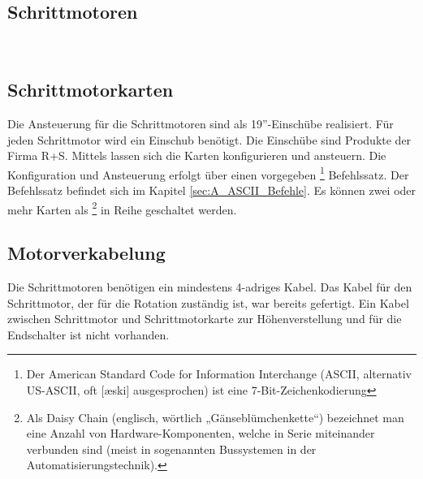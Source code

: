 \subsection{Schrittmotoren}
\label{sec:Schrittmotoren}
\\

\subsection{Schrittmotorkarten}
\label{sec:Schrittmotorkarten}
Die Ansteuerung für die Schrittmotoren sind als 19''-Einschübe realisiert. Für jeden Schrittmotor wird ein Einschub benötigt.
Die Einschübe sind Produkte der Firma R+S. Mittels  lassen sich die Karten konfigurieren und ansteuern. Die Konfiguration und Ansteuerung erfolgt über einen vorgegeben 
\footnote{Der American Standard Code for Information Interchange (ASCII, alternativ US-ASCII, oft [æski] ausgesprochen) ist eine 7-Bit-Zeichenkodierung\cite{wiki:ASCII}}
 Befehlssatz. Der Befehlssatz befindet sich im Kapitel \ref{sec:A_ASCII_Befehle}. Es können zwei oder mehr Karten als 
\footnote{Als Daisy Chain (englisch, wörtlich „Gänseblümchenkette“) bezeichnet man eine Anzahl von Hardware-Komponenten, welche in Serie miteinander verbunden sind (meist in sogenannten Bussystemen in der Automatisierungstechnik).\cite{wiki:Daisy} } 
in Reihe geschaltet werden.
\subsection{Motorverkabelung}
\label{sec:Motorverkabelung}
Die Schrittmotoren benötigen ein mindestens 4-adriges Kabel. Das Kabel für den Schrittmotor, der für die Rotation zuständig ist, war bereits gefertigt. Ein Kabel zwischen Schrittmotor und Schrittmotorkarte zur Höhenverstellung und für die Endschalter ist nicht vorhanden. 

